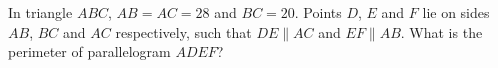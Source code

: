 In triangle $ABC$, $AB=AC=28$ and $BC=20$. Points $D$, $E$ and $F$ lie on sides $AB$, $BC$ and $AC$ respectively, such that $DE\parallel AC$ and $EF\parallel AB$. What is the perimeter of parallelogram $ADEF$?
